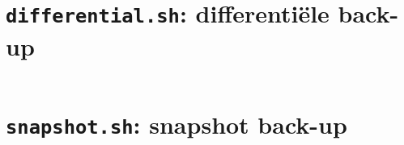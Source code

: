 \inputminted[breakanywhere,fontsize=\small,frame=single]{bash}{scripts/incremental.sh}

\section{\texttt{differential.sh}: differentiële back-up}
\label{app:differential-sh}

\inputminted[breakanywhere,fontsize=\small,frame=single]{bash}{scripts/differential.sh}

\section{\texttt{snapshot.sh}: snapshot back-up}
\label{app:snapshot-sh}

\inputminted[breakanywhere,fontsize=\small,frame=single]{bash}{scripts/snapshot.sh}